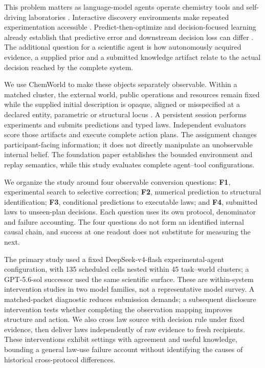 \documentclass{article}
\begin{document}
This problem matters as language-model agents operate chemistry tools
and self-driving laboratories
\citep{boiko2023autonomous, bran2024augmenting, szymanski2023alab, darvish2025organa, song2025chemagents, vriza2026instruments}.
Interactive discovery environments make repeated experimentation
accessible
\citep{jansen2024discoveryworld, gandhi2025boxinggym, duan2025scigym, zheng2026newtonbench, yang2026causalab, batzoglou2026replayscm}.
Predict-then-optimize and decision-focused learning already establish
that predictive error and downstream decision loss can differ
\citep{elmachtoub2022spo, wilder2019decisionfocused}. The additional
question for a scientific agent is how autonomously acquired evidence, a
supplied prior and a submitted knowledge artifact relate to the actual
decision reached by the complete system.

We use ChemWorld to make these objects separately observable. Within a
matched cluster, the external world, public operations and resources
remain fixed while the supplied initial description is opaque, aligned
or misspecified at a declared entity, parametric or structural locus
\citep{qiu2026chemworld}. A persistent session performs experiments and
submits predictions and typed laws. Independent evaluators score those
artifacts and execute complete action plans. The assignment changes
participant-facing information; it does not directly manipulate an
unobservable internal belief. The foundation paper establishes the
bounded environment and replay semantics, while this study evaluates
complete agent--tool configurations.

We organize the study around four observable conversion questions:
\textbf{F1}, experimental search to selective correction; \textbf{F2},
numerical prediction to structural identification; \textbf{F3},
conditional predictions to executable laws; and \textbf{F4}, submitted
laws to unseen-plan decisions. Each question uses its own protocol,
denominator and failure accounting. The four questions do not form an
identified internal causal chain, and success at one readout does not
substitute for measuring the next.

The primary study used a fixed DeepSeek-v4-flash experimental-agent
configuration, with 135 scheduled cells nested within 45 task--world
clusters; a GPT-5.6-sol successor used the same scientific surface.
These are within-system intervention studies in two model families, not
a representative model survey. A matched-packet diagnostic reduces
submission demands; a subsequent disclosure intervention tests whether
completing the observation mapping improves structure and action. We
also cross law source with decision rule under fixed evidence, then
deliver laws independently of raw evidence to fresh recipients. These
interventions exhibit settings with agreement and useful knowledge,
bounding a general law-use failure account without identifying the
causes of historical cross-protocol differences.
\end{document}
